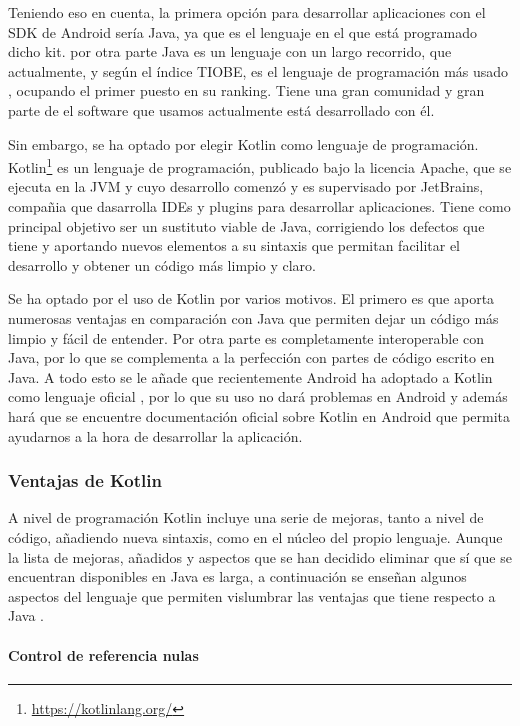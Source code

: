 Teniendo eso en cuenta, la primera opción para desarrollar aplicaciones con el SDK de Android sería Java, ya que es el lenguaje en el que está programado dicho kit. por otra parte Java es un lenguaje con un largo recorrido, que actualmente, y según el índice TIOBE, es el lenguaje de programación más usado \cite{tiobe}, ocupando el primer puesto en su ranking. Tiene una gran comunidad y gran parte de el software que usamos actualmente está desarrollado con él.

Sin embargo, se ha optado por elegir Kotlin como lenguaje de programación. Kotlin\footnote{\url{https://kotlinlang.org/}} es un lenguaje de programación, publicado bajo la licencia Apache, que se ejecuta en la JVM y cuyo desarrollo comenzó y es supervisado por JetBrains, compañia que dasarrolla IDEs y plugins para desarrollar aplicaciones. Tiene como principal objetivo ser un sustituto viable de Java, corrigiendo los defectos que tiene y aportando nuevos elementos a su sintaxis que permitan facilitar el desarrollo y obtener un código más limpio y claro.

Se ha optado por el uso de Kotlin por varios motivos. El primero es que aporta numerosas ventajas en comparación con Java que permiten dejar un código más limpio y fácil de entender. Por otra parte es completamente interoperable con Java, por lo que se complementa a la perfección con partes de código escrito en Java. A todo esto se le añade que recientemente Android ha adoptado a Kotlin como lenguaje oficial \cite{kotlin-android}, por lo que su uso no dará problemas en Android y además hará que se encuentre documentación oficial sobre Kotlin en Android que permita ayudarnos a la hora de desarrollar la aplicación.

\subsubsection{Ventajas de Kotlin}

A nivel de programación Kotlin incluye una serie de mejoras, tanto a nivel de código, añadiendo nueva sintaxis, como en el núcleo del propio lenguaje. Aunque la lista de mejoras, añadidos y aspectos que se han decidido eliminar que sí que se encuentran disponibles en Java es larga, a continuación se enseñan algunos aspectos del lenguaje que permiten vislumbrar las ventajas que tiene respecto a Java \cite{kotlin-vs-java}.

\paragraph{Control de referencia nulas}

